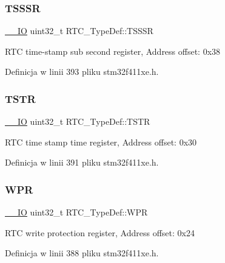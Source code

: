 \subsubsection{\texorpdfstring{T\+S\+S\+SR}{TSSSR}}
{\footnotesize\ttfamily \hyperlink{core__sc300_8h_aec43007d9998a0a0e01faede4133d6be}{\+\_\+\+\_\+\+IO} uint32\+\_\+t R\+T\+C\+\_\+\+Type\+Def\+::\+T\+S\+S\+SR}

R\+TC time-\/stamp sub second register, Address offset\+: 0x38 

Definicja w linii 393 pliku stm32f411xe.\+h.

\mbox{\label{struct_r_t_c___type_def_a1ddbb2a5eaa54ff43835026dec99ae1c}} 
\subsubsection{\texorpdfstring{T\+S\+TR}{TSTR}}
{\footnotesize\ttfamily \hyperlink{core__sc300_8h_aec43007d9998a0a0e01faede4133d6be}{\+\_\+\+\_\+\+IO} uint32\+\_\+t R\+T\+C\+\_\+\+Type\+Def\+::\+T\+S\+TR}

R\+TC time stamp time register, Address offset\+: 0x30 

Definicja w linii 391 pliku stm32f411xe.\+h.

\mbox{\label{struct_r_t_c___type_def_ad54765af56784498a3ae08686b79a1ff}} 
\subsubsection{\texorpdfstring{W\+PR}{WPR}}
{\footnotesize\ttfamily \hyperlink{core__sc300_8h_aec43007d9998a0a0e01faede4133d6be}{\+\_\+\+\_\+\+IO} uint32\+\_\+t R\+T\+C\+\_\+\+Type\+Def\+::\+W\+PR}

R\+TC write protection register, Address offset\+: 0x24 

Definicja w linii 388 pliku stm32f411xe.\+h.

\mbox{\label{struct_r_t_c___type_def_ad93017bb0a778a2aad9cd71211fc770a}} 
